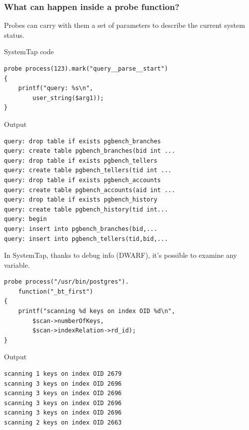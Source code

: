 \documentclass{beamer}
\begin{document}
\begin{frame}[fragile]
     \frametitle{What can happen inside a probe function?}
     Probes can carry with them a set of parameters to describe the current
     system status.
     \begin{exampleblock}{SystemTap code}
         \begin{lstlisting}
probe process(123).mark("query__parse__start")
{
    printf("query: %s\n",
        user_string($arg1));
}
         \end{lstlisting}
     \end{exampleblock}
\end{frame}

\begin{frame}[fragile]
     \begin{exampleblock}{Output}
     \begin{verbatim}
query: drop table if exists pgbench_branches
query: create table pgbench_branches(bid int ...
query: drop table if exists pgbench_tellers
query: create table pgbench_tellers(tid int ...
query: drop table if exists pgbench_accounts
query: create table pgbench_accounts(aid int ...
query: drop table if exists pgbench_history
query: create table pgbench_history(tid int...
query: begin
query: insert into pgbench_branches(bid,...
query: insert into pgbench_tellers(tid,bid,...
     \end{verbatim}
     \end{exampleblock}
\end{frame}

\begin{frame}[fragile]
     In SystemTap, thanks to debug info (DWARF), it's possible to examine any variable.
     \begin{example}
         \begin{lstlisting}
probe process("/usr/bin/postgres").
    function("_bt_first")
{
    printf("scanning %d keys on index OID %d\n",
        $scan->numberOfKeys,
        $scan->indexRelation->rd_id); 
}
         \end{lstlisting}
     \end{example}
\end{frame}

\begin{frame}[fragile]
     \begin{exampleblock}{Output}
     \begin{verbatim}
scanning 1 keys on index OID 2679
scanning 3 keys on index OID 2696
scanning 3 keys on index OID 2696
scanning 3 keys on index OID 2696
scanning 3 keys on index OID 2696
scanning 2 keys on index OID 2663
     \end{verbatim}
     \end{exampleblock}
\end{frame}
\end{document}
